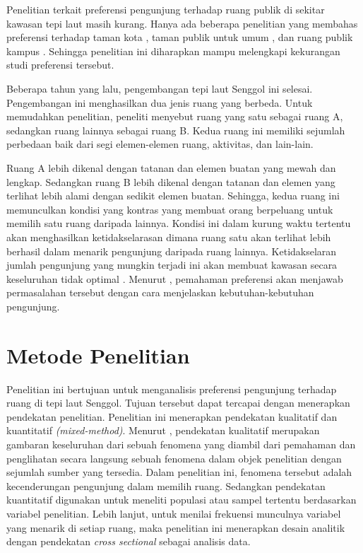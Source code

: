 \documentclass[11pt]{udthesis} %
\begin{document}
Penelitian terkait preferensi pengunjung terhadap ruang publik di sekitar kawasan tepi laut masih kurang. Hanya ada beberapa penelitian yang membahas preferensi terhadap taman kota \citep{alves2008,devysandra2012,dwiputra2017,madureira2018}, taman publik untuk umum  \citep{grilli2020}, dan ruang publik kampus \citep{zhang2006}. Sehingga penelitian ini diharapkan mampu melengkapi kekurangan studi preferensi tersebut.

Beberapa tahun yang lalu, pengembangan tepi laut Senggol ini selesai. Pengembangan ini menghasilkan dua jenis ruang yang berbeda. Untuk memudahkan penelitian, peneliti menyebut ruang yang satu sebagai ruang A, sedangkan ruang lainnya sebagai ruang B. Kedua ruang ini memiliki sejumlah perbedaan baik dari segi elemen-elemen ruang, aktivitas, dan lain-lain.

Ruang A lebih dikenal dengan tatanan dan elemen buatan yang mewah dan lengkap. Sedangkan ruang B lebih dikenal dengan tatanan dan elemen yang terlihat lebih alami dengan sedikit elemen buatan. Sehingga, kedua ruang ini memunculkan kondisi yang kontras yang membuat orang berpeluang untuk memilih satu ruang daripada lainnya. Kondisi ini dalam kurung waktu tertentu akan menghasilkan ketidakselarasan dimana ruang satu akan terlihat lebih berhasil dalam menarik pengunjung daripada ruang lainnya. Ketidakselaran jumlah pengunjung yang mungkin terjadi ini akan membuat kawasan secara keseluruhan tidak optimal \citep{sari2015}. Menurut \cite{madureira2018}, pemahaman preferensi akan menjawab permasalahan tersebut dengan cara menjelaskan kebutuhan-kebutuhan pengunjung.



\section{Metode Penelitian}
\label{sub:metpen}

Penelitian ini bertujuan untuk menganalisis preferensi pengunjung terhadap ruang di tepi laut Senggol. Tujuan tersebut dapat tercapai dengan menerapkan pendekatan penelitian. Penelitian ini menerapkan pendekatan kualitatif dan kuantitatif \textit{(mixed-method)}. Menurut \cite{creswell2016}, pendekatan kualitatif merupakan gambaran keseluruhan dari sebuah fenomena yang diambil dari pemahaman dan penglihatan secara langsung sebuah fenomena dalam objek penelitian dengan sejumlah sumber yang tersedia. Dalam penelitian ini, fenomena tersebut adalah kecenderungan pengunjung dalam memilih ruang. Sedangkan pendekatan kuantitatif digunakan untuk meneliti populasi atau sampel tertentu berdasarkan variabel penelitian. Lebih lanjut, untuk menilai frekuensi munculnya variabel yang menarik di setiap ruang, maka penelitian ini menerapkan desain analitik dengan pendekatan \textit{cross sectional} sebagai analisis data.
\end{document}
